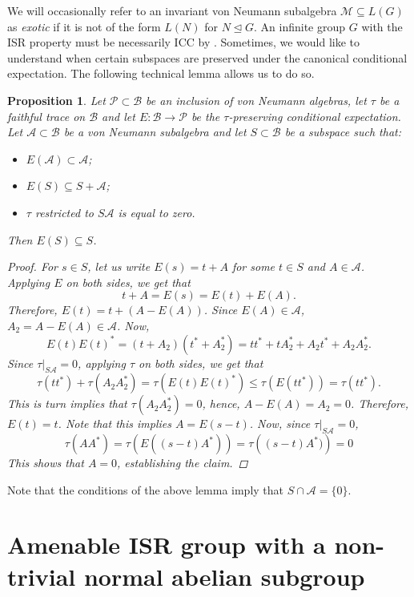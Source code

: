 \documentclass[11pt]{amsart}
\theoremstyle{plain}
\newtheorem{proposition}[theorem]{Proposition}
\theoremstyle{definition}
\theoremstyle{remark}
\numberwithin{equation}{section}
\begin{document}
We will occasionally refer to an invariant von Neumann subalgebra $\mathcal M \subseteq L(G)$ as \emph{exotic} if it is not of the form $L(N)$ for $N\trianglelefteq G$. An infinite group $G$ with the ISR property must be necessarily ICC by \cite[Proposition 3.1]{amrutam2023invariant}.
Sometimes, we would like to understand when certain subspaces are preserved under the canonical conditional expectation. The following technical lemma allows us to do so.
\begin{proposition}\label{prop: E(S) subset S}
	Let $\mathcal P\subset\mathcal B$ be an inclusion of von Neumann algebras, let  $\mathcal\tau$ be a faithful trace on $\mathcal B$ and let $E:\mathcal B\to\mathcal P$ be the $\tau$-preserving conditional expectation. Let $\mathcal A\subset\mathcal B$ be a von Neumann subalgebra and let $S\subset\mathcal B$ be a subspace such that:
	\begin{itemize}
		\item $E(\mathcal A)\subset\mathcal A$;
		\item $E(S)\subseteq S+\mathcal A$;
		\item $\tau$ restricted to $S\mathcal A$ is equal to zero.
	\end{itemize}
	Then $E(S)\subseteq S$.
	\begin{proof}
		For $s\in S$, let us write $E(s)=t+A$ for some $t\in S$ and $A\in\mathcal{A}$. Applying $E$ on both sides, we get that
		\[t+A=E(s)=E(t)+E(A).\]
		Therefore, $E(t)=t+(A-E(A))$. Since $E(A)\in\mathcal{A}$, $A_2=A-E(A)\in\mathcal{A}$. Now, 
		\[E(t)E(t)^*=(t+A_2)(t^*+A_2^*)=tt^*+tA_2^*+A_2t^*+A_2A_2^*.\]
		Since $\tau|_{S\mathcal{A}}=0$, applying $\tau$ on both sides, we get that
		\[\tau(tt^*)+\tau(A_2A_2^*)=\tau\left(E(t)E(t)^*\right)\le \tau(E(tt^*))=\tau(tt^*).\]
		This is turn implies that $\tau(A_2A_2^*)=0$, hence, $A-E(A)=A_2=0$. Therefore, $E(t)=t$. Note that this implies $A=E(s-t)$. Now, since $\tau|_{S\mathcal{A}}=0$,
		\[\tau(AA^*)=\tau\left(E((s-t)A^*)\right)=\tau\left((s-t)A^*)\right)=0\]
		This shows that $A=0$, establishing the claim.
	\end{proof}
\end{proposition}\noindent
Note that the conditions of the above lemma imply that $S \cap \mathcal{A} =\{0\}$.

\section{Amenable ISR group with a non-trivial normal abelian subgroup} \label{sec:ISR}
\end{document}
